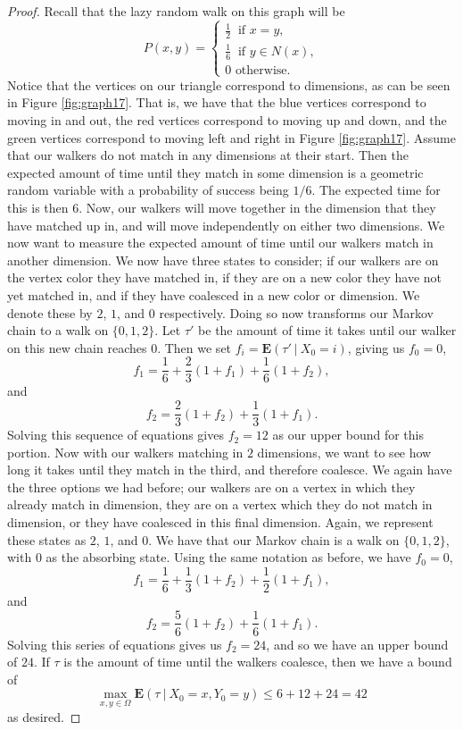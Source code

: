 \documentclass[10pt,a4paper]{amsart}
\theoremstyle{definition}
\numberwithin{definition}{section}
\begin{document}
\begin{proof}
Recall that the lazy random walk on this graph will be 
\[P(x,y) = \begin{cases} \frac{1}{2} \ \text{ if } x = y, \\ \frac{1}{6} \ \text{ if } y \in N(x), \\ 0 \text { otherwise.} \end{cases} \]
Notice that the vertices on our triangle correspond to dimensions, as can be seen in Figure \ref{fig:graph17}. That is, we have that the blue vertices correspond to moving in and out, the red vertices correspond to moving up and down, and the green vertices correspond to moving left and right in Figure \ref{fig:graph17}. Assume that our walkers do not match in any dimensions at their start. Then the expected amount of time until they match in some dimension is a geometric random variable with a probability of success being $1/6$. The expected time for this is then $6$. Now, our walkers will move together in the dimension that they have matched up in, and will move independently on either two dimensions. We now want to measure the expected amount of time until our walkers match in another dimension. We now have three states to consider; if our walkers are on the vertex color they have matched in, if they are on a new color they have not yet matched in, and if they have coalesced in a new color or dimension. We denote these by $2$, $1$, and $0$ respectively. Doing so now transforms our Markov chain to a walk on $\{0,1,2\}$. Let $\tau'$ be the amount of time it takes until our walker on this new chain reaches $0$. Then we set $f_i = \mathbf{E}(\tau' \ | \ X_0 = i)$, giving us $f_0 = 0$, 
\[f_1 = \frac{1}{6} + \frac{2}{3}(1+f_1) + \frac{1}{6}(1+f_2), \]
and
\[f_2 = \frac{2}{3}(1+f_2) + \frac{1}{3}(1+f_1). \]
Solving this sequence of equations gives $f_2 = 12$ as our upper bound for this portion. Now with our walkers matching in $2$ dimensions, we want to see how long it takes until they match in the third, and therefore coalesce. We again have the three options we had before; our walkers are on a vertex in which they already match in dimension, they are on a vertex which they do not match in dimension, or they have coalesced in this final dimension. Again, we represent these states as $2$, $1$, and $0$. We have that our Markov chain is a walk on $\{0,1,2\}$, with $0$ as the absorbing state. Using the same notation as before, we have $f_0 = 0$,
\[f_1 = \frac{1}{6} + \frac{1}{3}(1+f_2) + \frac{1}{2}(1+f_1), \]
and
\[ f_2 = \frac{5}{6}(1+f_2) + \frac{1}{6}(1+f_1).\]
Solving this series of equations gives us $f_2 = 24$, and so we have an upper bound of $24$. If $\tau$ is the amount of time until the walkers coalesce, then we have a bound of 
\[\max_{x,y \in \Omega} \mathbf{E}(\tau \ | \ X_0 = x, Y_0 =y) \leq 6 + 12 + 24 =  42\]
as desired.
\end{proof}
\end{document}
